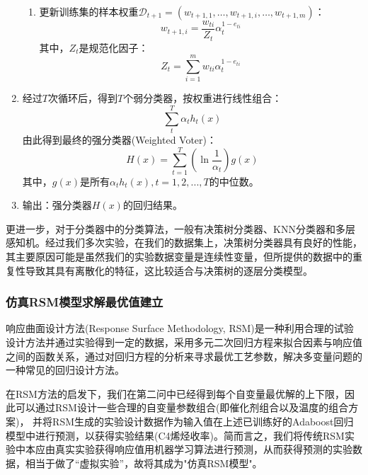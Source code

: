 \documentclass[withoutpreface,bwprint]{cumcmthesis} %
\begin{document}
\begin{enumerate}
\begin{enumerate}
		 \item 更新训练集的样本权重${​{\mathcal D}_{t + 1}} = \left( {​{w_{t + 1,1}}, \ldots ,{w_{t + 1,i}}, \ldots ,{w_{t + 1,m}}} \right)$：
		 \begin{equation*}
		 w _ { t + 1 , i } = \frac { w _ { t i } } { Z _ {t } } \alpha _ { t } ^ { 1 - e_ {ti} }
		\end{equation*}
		 其中，${​{Z_t}}$是规范化因子：
		 \begin{equation*}
		 		  Z _ { t } = \sum _ { i = 1 } ^ { m } w _ { t i } \alpha _ { t } ^ { 1 - e_{ti} }
		 \end{equation*}
	
	\end{enumerate}
	\item 经过$T$次循环后，得到$T$个弱分类器，按权重进行线性组合：
	\begin{equation*}
		\sum\limits_t^T {​{\alpha _t}{h_t}\left( x \right)}
	\end{equation*}
	由此得到最终的强分类器(Weighted Voter)：
	\begin{equation*}
		H( x ) = \sum _ { t = 1 } ^ { T } \left( \ln \frac { 1 } { \alpha _ { t } } \right) g ( x )
	\end{equation*}
	其中，$g(x)$是所有${\alpha _t}{h_t}\left( x \right),t=1,2,...,T$的中位数。
	\item  输出：强分类器$H(x)$的回归结果。
\end{enumerate}

更进一步，对于分类器中的分类算法，一般有决策树分类器、KNN分类器和多层感知机。经过我们多次实验，在我们的数据集上，决策树分类器具有良好的性能，其主要原因可能是虽然我们的实验数据变量是连续性变量，但所提供的数据中的重复性导致其具有离散化的特征，这比较适合与决策树的逐层分类模型。

\subsubsection{仿真RSM模型求解最优值建立}
响应曲面设计方法(Response Surface Methodology, RSM)是一种利用合理的试验设计方法并通过实验得到一定的数据，采用多元二次回归方程来拟合因素与响应值之间的函数关系，通过对回归方程的分析来寻求最优工艺参数，解决多变量问题的一种常见的回归设计方法。

在RSM方法的启发下，我们在第二问中已经得到每个自变量最优解的上下限，因此可以通过RSM设计一些合理的自变量参数组合(即催化剂组合以及温度的组合方案)， 并将RSM生成的实验设计数据作为输入值在上述已训练好的Adaboost回归模型中进行预测，以获得实验结果(C4烯烃收率)。简而言之，我们将传统RSM实验中本应由真实实验获得响应值用机器学习算法进行预测，从而获得预测的实验数据，相当于做了“虚拟实验”，故将其成为"仿真RSM模型"。
\end{document}
